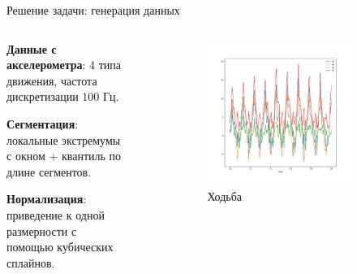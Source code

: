 \documentclass{beamer}
\begin{document}
\begin{frame}{Решение задачи: генерация данных}
    \begin{columns} %
        \begin{column}{.4\textwidth}
            \textbf{Данные с акселерометра}: 4 типа движения, частота дискретизации
            100 Гц.

            \textbf{Сегментация}: локальные экстремумы с окном + квантиль по длине
            сегментов.

            \textbf{Нормализация}: приведение к одной размерности с помощью
            кубических сплайнов.

        \end{column}%
        \hfill
        \begin{column}{\textwidth}
            \begin{figure}
                \begin{subfigure}[b]{0.25\textwidth}
                    \centering
                    \includegraphics[width=\linewidth]{../pics/raw_walking.png}
                    \caption{Ходьба}
                    \label{fig:sfig1}
                \end{subfigure}
                \begin{subfigure}[b]{0.25\textwidth}

\end{subfigure}
\end{figure}
\end{column}
\end{columns}
\end{frame}
\end{document}
